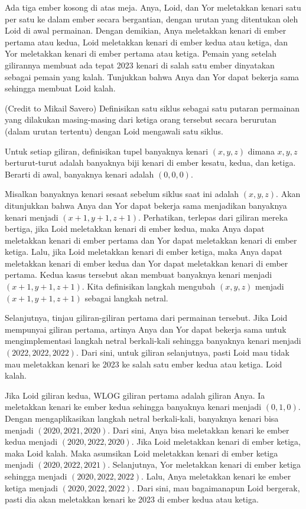 \documentclass[11pt]{scrartcl}
\begin{document}
\begin{soaljawab}
Ada tiga ember kosong di atas meja. Anya, Loid, dan Yor meletakkan kenari satu per satu ke dalam ember secara bergantian, dengan urutan yang ditentukan oleh Loid di awal permainan. Dengan demikian, Anya meletakkan kenari di ember pertama atau kedua, Loid meletakkan kenari di ember kedua atau ketiga, dan Yor meletakkan kenari di ember pertama atau ketiga. Pemain yang setelah gilirannya membuat ada tepat 2023 kenari di salah satu ember dinyatakan sebagai pemain yang kalah. Tunjukkan bahwa Anya dan Yor dapat bekerja sama sehingga membuat Loid kalah.
    \begin{solusi}
        (Credit to Mikail Savero)
        Definisikan satu siklus sebagai satu putaran permainan yang dilakukan masing-masing dari ketiga orang tersebut secara berurutan (dalam urutan tertentu) dengan Loid mengawali satu siklus.

        Untuk setiap giliran, definisikan tupel banyaknya kenari $(x,y,z)$ dimana $x,y,z$ berturut-turut adalah banyaknya biji kenari di ember kesatu, kedua, dan ketiga. Berarti di awal, banyaknya kenari adalah $(0,0,0)$. 

        Misalkan banyaknya kenari sesaat sebelum siklus saat ini adalah $(x,y,z)$. Akan ditunjukkan bahwa Anya dan Yor dapat bekerja sama menjadikan banyaknya kenari menjadi $(x+1,y+1,z+1)$. Perhatikan, terlepas dari giliran mereka bertiga, jika Loid meletakkan kenari di ember kedua, maka Anya dapat meletakkan kenari di ember pertama dan Yor dapat meletakkan kenari di ember ketiga. Lalu, jika Loid meletakkan kenari di ember ketiga, maka Anya dapat meletakkan kenari di ember kedua dan Yor dapat meletakkan kenari di ember pertama. Kedua kasus tersebut akan membuat banyaknya kenari menjadi $(x+1, y+1, z+1)$. Kita definisikan langkah mengubah $(x,y,z)$ menjadi $(x+1,y+1,z+1)$ sebagai langkah netral.

        Selanjutnya, tinjau giliran-giliran pertama dari permainan tersebut. Jika Loid mempunyai giliran pertama, artinya Anya dan Yor dapat bekerja sama untuk mengimplementasi langkah netral berkali-kali sehingga banyaknya kenari menjadi $(2022,2022,2022)$. Dari sini, untuk giliran selanjutnya, pasti Loid mau tidak mau meletakkan kenari ke 2023 ke salah satu ember kedua atau ketiga. Loid kalah.

        Jika Loid giliran kedua, WLOG giliran pertama adalah giliran Anya. Ia meletakkan kenari ke ember kedua sehingga banyaknya kenari menjadi $(0,1,0)$. Dengan mengaplikasikan langkah netral berkali-kali, banyaknya kenari bisa menjadi $(2020,2021,2020)$. Dari sini, Anya bisa meletakkan kenari ke ember kedua menjadi $(2020,2022,2020)$. Jika Loid meletakkan kenari di ember ketiga, maka Loid kalah. Maka asumsikan Loid meletakkan kenari di ember ketiga menjadi $(2020,2022,2021)$. Selanjutnya, Yor meletakkan kenari di ember ketiga sehingga menjadi $(2020,2022,2022)$. Lalu, Anya meletakkan kenari ke ember ketiga menjadi $(2020,2022,2022)$. Dari sini, mau bagaimanapun Loid bergerak, pasti dia akan meletakkan kenari ke 2023 di ember kedua atau ketiga.


\end{solusi}
\end{soaljawab}
\end{document}
